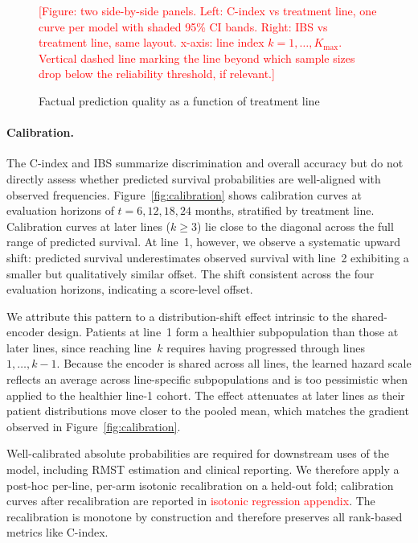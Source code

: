 \documentclass[a4paper,10pt]{article}
\begin{document}
\begin{figure}[h]
\centering
\textcolor{red}{[Figure: two side-by-side panels. Left: C-index vs treatment line, one curve per model with shaded 95\% CI bands. Right: IBS vs treatment line, same layout. x-axis: line index $k = 1, \ldots, K_{\max}$. Vertical dashed line marking the line beyond which sample sizes drop below the reliability threshold, if relevant.]}
\caption{Factual prediction quality as a function of treatment line}
\label{fig:factual-perline}
\end{figure}

\paragraph{Calibration.} The C-index and IBS summarize discrimination and overall accuracy but do not directly assess whether predicted survival probabilities are well-aligned with observed frequencies. Figure~\ref{fig:calibration} shows calibration curves at evaluation horizons of $t = 6, 12, 18, 24$ months, stratified by treatment line. Calibration curves at later lines ($k \geq 3$) lie close to the diagonal across the full range of predicted survival. At line~1, however, we observe a systematic upward shift: predicted survival underestimates observed survival with line~2 exhibiting a smaller but qualitatively similar offset. The shift consistent across the four evaluation horizons, indicating a score-level offset.

We attribute this pattern to a distribution-shift effect intrinsic to the shared-encoder design. Patients at line~1 form a healthier subpopulation than those at later lines, since reaching line~$k$ requires having progressed through lines $1, \ldots, k-1$. Because the encoder is shared across all lines, the learned hazard scale reflects an average across line-specific subpopulations and is too pessimistic when applied to the healthier line-1 cohort. The effect attenuates at later lines as their patient distributions move closer to the pooled mean, which matches the gradient observed in Figure~\ref{fig:calibration}.

Well-calibrated absolute probabilities are required for downstream uses of the model, including RMST estimation and clinical reporting. We therefore apply a post-hoc per-line, per-arm isotonic recalibration on a held-out fold; calibration curves after recalibration are reported in \textcolor{red}{isotonic regression appendix}. The recalibration is monotone by construction and therefore preserves all rank-based metrics like C-index.
\end{document}
